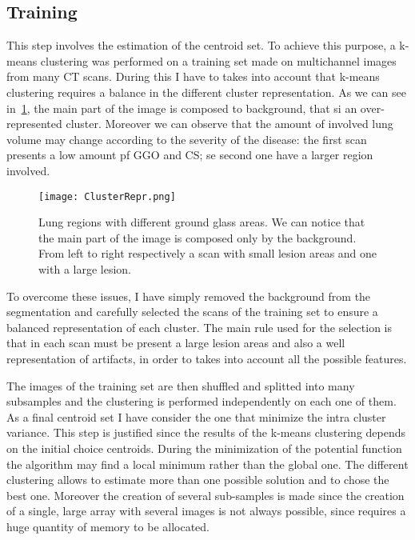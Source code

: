 \documentclass{standalone}
\begin{document}
	\subsection*{Training}
	
	This step involves the estimation of the centroid set. To achieve this purpose, a k-means clustering was performed on a training set made on multichannel images from many CT scans. During this I have to takes into account that k-means clustering requires a balance in the different cluster representation. As we can see in \figurename\,\ref{fig:ClusterRepr}, the main part of the image is composed to background, that si an over-represented cluster. Moreover we can observe that the amount of involved lung volume may change according to the  severity of the disease: the first scan presents a low amount pf GGO and CS; se second one have a larger region involved. 
	\begin{figure}[h!]
		\centering
		\texttt{[image: ClusterRepr.png]}
		\caption{Lung regions with different ground glass areas. We can notice that the main part of the image is composed only by the background. From left to right respectively a scan with small lesion areas and one with a large lesion. }\label{fig:ClusterRepr}
	\end{figure}

	
	To overcome these issues, I have simply removed the background from the segmentation and carefully selected the scans of the training set to ensure a balanced representation of each cluster. The main rule used for the selection is that in each scan must be present a large lesion areas and also a well representation of artifacts, in order to takes into account all the possible features.
	
	The images of the training set are then shuffled and splitted into many subsamples and the clustering is performed independently on each one of them. As a final centroid set I have consider the one that minimize the intra cluster variance. This step is justified since the results of the k-means clustering depends on the initial choice centroids. During the minimization of the potential function the algorithm may find a local minimum rather than the global one. The different clustering allows to estimate more than one possible solution and to chose the best one. 		
	Moreover the creation of several sub-samples is made since the creation of a single, large array with several images is not always possible, since requires a huge quantity of memory to be allocated.
\end{document}
